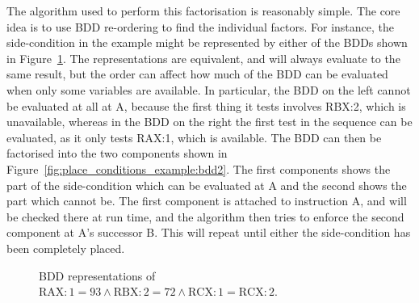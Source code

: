 The algorithm used to perform this factorisation is reasonably simple.
The core idea is to use BDD re-ordering to find the individual
factors.  For instance, the side-condition in the example might be
represented by either of the BDDs shown in
Figure~\ref{fig:place_conditions_example:bdd1}.  The representations
are equivalent, and will always evaluate to the same result, but the
order can affect how much of the BDD can be evaluated when only some
variables are available.  In particular, the BDD on the left cannot be
evaluated at all at A, because the first thing it tests involves
RBX:2, which is unavailable, whereas in the BDD on the right the first
test in the sequence can be evaluated, as it only tests RAX:1, which
is available.  The BDD can then be factorised into the two components
shown in Figure~\ref{fig:place_conditions_example:bdd2}.  The first
components shows the part of the side-condition which can be evaluated
at A and the second shows the part which cannot be.  The first
component is attached to instruction A, and will be checked there at
run time, and the algorithm then tries to enforce the second component
at A's successor B.  This will repeat until either the side-condition
has been completely placed.

\begin{figure}
  \hfill%
  \begin{subfloat}
  \end{subfloat}%
  \hfill%
  \begin{subfloat}
  \end{subfloat}
  \hfill%
  \caption{BDD representations of $\mathrm{RAX:1} = 93 \wedge
    \mathrm{RBX:2} = 72 \wedge \mathrm{RCX:1} = \mathrm{RCX:2}$.}
  \label{fig:place_conditions_example:bdd1}
\end{figure}

